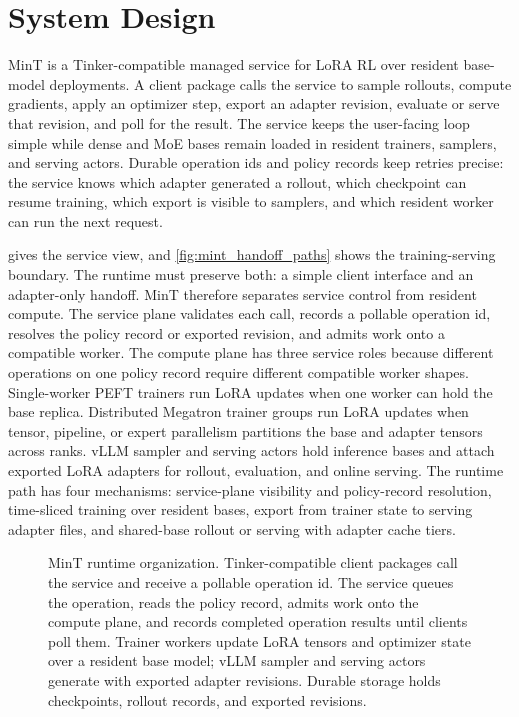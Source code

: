 \section{System Design}
\label{sec:architecture}

MinT is a Tinker-compatible managed service for LoRA RL over resident base-model deployments. A client package calls the service to sample rollouts, compute gradients, apply an optimizer step, export an adapter revision, evaluate or serve that revision, and poll for the result. The service keeps the user-facing loop simple while dense and MoE bases remain loaded in resident trainers, samplers, and serving actors. Durable operation ids and policy records keep retries precise: the service knows which adapter generated a rollout, which checkpoint can resume training, which export is visible to samplers, and which resident worker can run the next request.

 gives the service view, and \cref{fig:mint_handoff_paths} shows the training-serving boundary. The runtime must preserve both: a simple client interface and an adapter-only handoff. MinT therefore separates service control from resident compute. The service plane validates each call, records a pollable operation id, resolves the policy record or exported revision, and admits work onto a compatible worker. The compute plane has three service roles because different operations on one policy record require different compatible worker shapes. Single-worker PEFT trainers run LoRA updates when one worker can hold the base replica. Distributed Megatron trainer groups run LoRA updates when tensor, pipeline, or expert parallelism partitions the base and adapter tensors across ranks. vLLM sampler and serving actors hold inference bases and attach exported LoRA adapters for rollout, evaluation, and online serving. The runtime path has four mechanisms: service-plane visibility and policy-record resolution, time-sliced training over resident bases, export from trainer state to serving adapter files, and shared-base rollout or serving with adapter cache tiers.

\begin{figure}[tbp]
    \centering
    \resizebox{\textwidth}{!}{}
\caption{MinT runtime organization. Tinker-compatible client packages call the service and receive a pollable operation id. The service queues the operation, reads the policy record, admits work onto the compute plane, and records completed operation results until clients poll them. Trainer workers update LoRA tensors and optimizer state over a resident base model; vLLM sampler and serving actors generate with exported adapter revisions. Durable storage holds checkpoints, rollout records, and exported revisions.}
    \label{fig:mint_architecture}
\end{figure}

